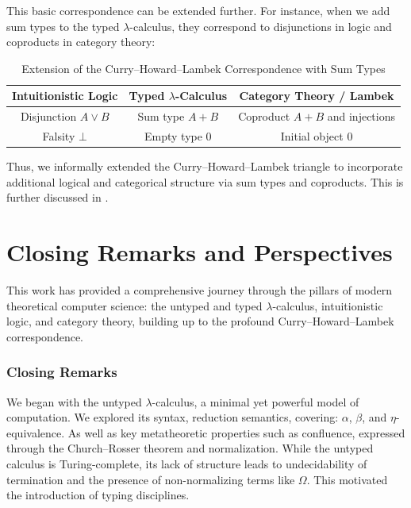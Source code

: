 This basic correspondence can be extended further. For instance, when we add sum types to the typed $\lambda$-calculus, they correspond to disjunctions in logic and coproducts in category theory:

\begin{table}[h!]
  \centering
  \caption{Extension of the Curry--Howard--Lambek Correspondence with Sum Types}
  \label{tab:CHL-sum}
  \begin{tabular}{|c|c|c|}
    \hline
    \textbf{Intuitionistic Logic} & \textbf{Typed $\lambda$-Calculus} & \textbf{Category Theory / Lambek} \\
    \hline
    Disjunction $A \lor B$ & Sum type $A + B$ & Coproduct $A + B$ and injections \\
    Falsity $\bot$ & Empty type $0$ & Initial object $0$ \\
    \hline
  \end{tabular}
\end{table}

Thus, we informally extended the Curry--Howard--Lambek triangle to incorporate additional logical and categorical structure via sum types and coproducts. This is further discussed in \cites{Jacobs1999categorical}{maclane1971categories}{girard1989:proofs-and-types}{pierce1991basic}{barr1998category}.

\section{\centering Closing Remarks and Perspectives}

This work has provided a comprehensive journey through the pillars of modern theoretical computer science: the untyped and typed $\lambda$-calculus, intuitionistic logic, and category theory, building up to the profound  Curry--Howard--Lambek correspondence.

\subsubsection{\centering Closing Remarks}

We began with the untyped $\lambda$-calculus, a minimal yet powerful model of computation. We explored its syntax, reduction semantics, covering: $\alpha$, $\beta$, and $\eta$-equivalence. As well as key metatheoretic properties such as confluence, expressed through the Church--Rosser theorem and normalization. While the untyped calculus is Turing-complete, its lack of structure leads to undecidability of termination and the presence of non-normalizing terms like $\Omega$. This motivated the introduction of typing disciplines.

